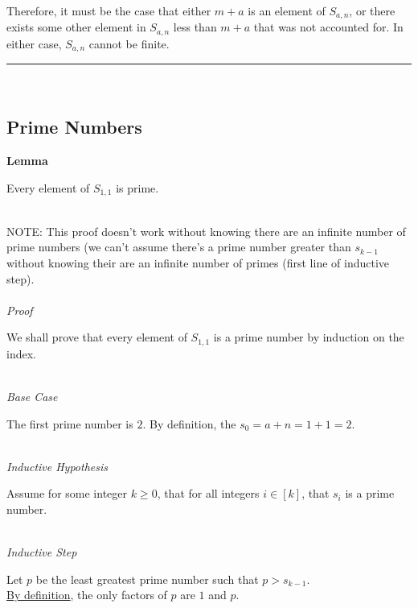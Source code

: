\documentclass[a4paper,12pt]{article}
\begin{document}
\noindent Therefore, it must be the case that either $m + a$ is an element of $S_{a,n}$, or there exists some other element in $S_{a,n}$ less than $m + a$ that was not accounted for. In either case, $S_{a,n}$ cannot be finite.


\begin{center}
\noindent\rule{8cm}{0.4pt}
\end{center}
\noindent \\






\subsection{Prime Numbers}

\label{lemma:asn_subset_prime}
\hypertarget{lemma:asn_subset_prime}{}
\begin{tcolorbox}
\textbf{Lemma}

Every element of $S_{1, 1}$ is prime. 
\end{tcolorbox}

\noindent \\
\noindent NOTE: This proof doesn't work without knowing there are an infinite number of prime numbers (we can't assume there's a prime number greater than $s_{k - 1}$ without knowing their are an infinite number of primes (first line of inductive step).\\

\noindent \\
\textit{Proof}

\noindent We shall prove that every element of $S_{1, 1}$ is a prime number by induction on the index.

\noindent \\
\textit{Base Case}

\noindent The first prime number is $2$. By definition, the $s_0 = a + n = 1 + 1 = 2$.


\noindent \\
\textit{Inductive Hypothesis}

\noindent Assume for some integer $k \geq 0$, that for all integers $i \in [k]$, that $s_i$ is a prime number.


\noindent \\
\textit{Inductive Step}

\noindent Let $p$ be the least greatest prime number such that $p > s_{k - 1}$.\\

\noindent \hyperlink{definition:prime_numbers}{By definition}, the only factors of $p$ are $1$ and $p$.\\
\end{document}
